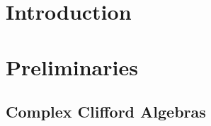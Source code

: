 \documentclass[aps,preprint]{revtex4}
\begin{document}
\title{}
\author{}
\maketitle

\begin{abstract}
We characterize the necessary and sufficient conditions for a partial normal
state defined on the subspace $\mathcal{A}_4 = \mathcal{A}^0 \oplus \mathcal{%
A}^2 \oplus \mathcal{A}^4 \subset C\ell_{2r}^+(\mathbb{C})$ (grades 0, 2,
and 4 of the even subalgebra of a complex Clifford algebra) to extend to a
full state on the entire even subalgebra. Using the explicit coefficient
expansion in terms of Clifford generators and the complete characterization
of grade-4 inhomogeneous projectors, we derive a linear programming
condition. The introduction of a number operator $N$ with integrality
condition $\mathrm{Tr}(Nd) = n \in \mathbb{Z}_{>0}$ forces the partial state
into the interior of the state space, guaranteeing multiple extensions,
including the canonical grand canonical ensemble $D_\beta = e^{-\beta N}/%
\mathrm{Tr}(e^{-\beta N})$.
\end{abstract}

\tableofcontents

\section{Introduction}

\section{Preliminaries}

\subsection{Complex Clifford Algebras}
\end{document}
